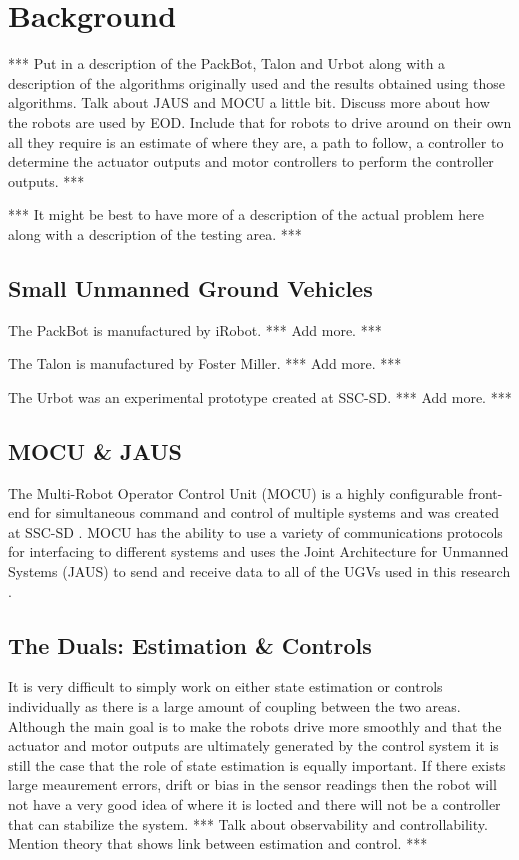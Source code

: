 \chapter{Background}
\label{ch:background}
*** Put in a description of the PackBot, Talon and Urbot along with a description of the algorithms originally used and the results obtained using those algorithms. Talk about JAUS and MOCU a little bit. Discuss more about how the robots are used by EOD. Include that for robots to drive around on their own all they require is an estimate of where they are, a path to follow, a controller to determine the actuator outputs and motor controllers to perform the controller outputs. ***

*** It might be best to have more of a description of the actual problem here along with a description of the testing area. ***

\section{Small Unmanned Ground Vehicles}
The PackBot is manufactured by iRobot. *** Add more. ***

The Talon is manufactured by Foster Miller. *** Add more. ***

The Urbot was an experimental prototype created at SSC-SD. *** Add more. ***

\section{MOCU \& JAUS}
The Multi-Robot Operator Control Unit (MOCU) is a highly configurable front-end for simultaneous command and control of multiple systems and was created at SSC-SD \cite{PowellMOCU08}. MOCU has the ability to use a variety of communications protocols for interfacing to different systems and uses the Joint Architecture for Unmanned Systems (JAUS) to send and receive data to all of the UGVs used in this research \cite{RoweJAUS08}.

\section{The Duals: Estimation \& Controls}
It is very difficult to simply work on either state estimation or controls individually as there is a large amount of coupling between the two areas. Although the main goal is to make the robots drive more smoothly and that the actuator and motor outputs are ultimately generated by the control system it is still the case that the role of state estimation is equally important. If there exists large meaurement errors, drift or bias in the sensor readings then the robot will not have a very good idea of where it is locted and there will not be a controller that can stabilize the system. *** Talk about observability and controllability. Mention theory that shows link between estimation and control. ***

